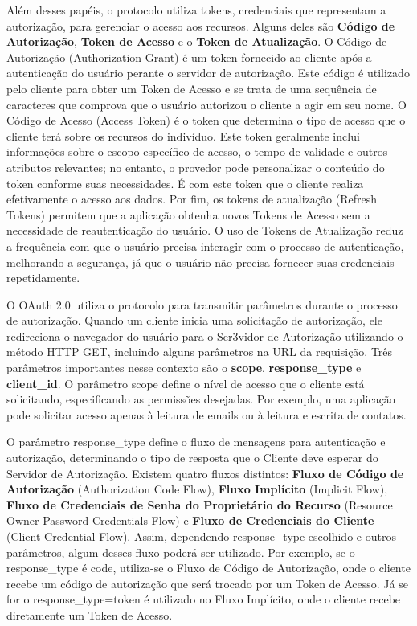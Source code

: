 Além desses papéis, o protocolo utiliza tokens, credenciais que representam a autorização, para gerenciar o acesso aos recursos. Alguns deles são \textbf{Código de Autorização}, \textbf{Token de Acesso} e o \textbf{Token de Atualização}. O Código de Autorização (Authorization Grant) é um token fornecido ao cliente após a autenticação do usuário perante o servidor de autorização. Este código é utilizado pelo cliente para obter um Token de Acesso e se trata de uma sequência de caracteres que comprova que o usuário autorizou o cliente a agir em seu nome. O Código de Acesso (Access Token) é o token que determina o tipo de acesso que o cliente terá sobre os recursos do indivíduo. Este token geralmente inclui informações sobre o escopo específico de acesso, o tempo de validade e outros atributos relevantes; no entanto, o provedor pode personalizar o conteúdo do token conforme suas necessidades. É com este token que o cliente realiza efetivamente o acesso aos dados. Por fim, os tokens de atualização (Refresh Tokens) permitem que a aplicação obtenha novos Tokens de Acesso sem a necessidade de reautenticação do usuário. O uso de Tokens de Atualização reduz a frequência com que o usuário precisa interagir com o processo de autenticação, melhorando a segurança, já que o usuário não precisa fornecer suas credenciais repetidamente.

O OAuth 2.0 utiliza o protocolo  para transmitir parâmetros durante o processo de autorização. Quando um cliente inicia uma solicitação de autorização, ele redireciona o navegador do usuário para o Ser3vidor de Autorização utilizando o método \acs{HTTP} GET, incluindo alguns parâmetros na URL da requisição. Três parâmetros importantes nesse contexto são o \textbf{scope}, \textbf{response\_type} e \textbf{client\_id}. O parâmetro scope define o nível de acesso que o cliente está solicitando, especificando as permissões desejadas. Por exemplo, uma aplicação pode solicitar acesso apenas à leitura de emails ou à leitura e escrita de contatos. 

O parâmetro response\_type define o fluxo de mensagens para autenticação e autorização, determinando o tipo de resposta que o Cliente deve esperar do Servidor de Autorização. Existem quatro fluxos distintos: \textbf{Fluxo de Código de Autorização} (Authorization Code Flow), \textbf{Fluxo Implícito} (Implicit Flow), \textbf{Fluxo de Credenciais de Senha do Proprietário do Recurso} (Resource Owner Password Credentials Flow) e \textbf{Fluxo de Credenciais do Cliente} (Client Credential Flow). Assim, dependendo response\_type escolhido e outros parâmetros, algum desses fluxo poderá ser utilizado. Por exemplo, se o response\_type é code, utiliza-se o Fluxo de Código de Autorização, onde o cliente recebe um código de autorização que será trocado por um Token de Acesso. Já se for o response\_type=token é utilizado no Fluxo Implícito, onde o cliente recebe diretamente um Token de Acesso.

